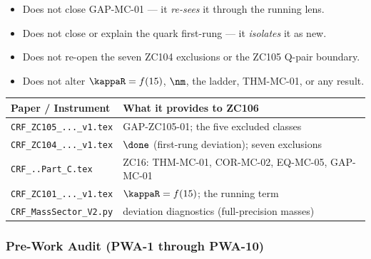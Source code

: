 \documentclass[12pt, a4paper]{article}
\begin{document}
\begin{keybox}[title={What ZC106 Does NOT Do}]
\begin{itemize}[leftmargin=2em, noitemsep]
  \item Does not close GAP-MC-01 --- it \emph{re-sees} it through the running lens.
  \item Does not close or explain the quark first-rung --- it \emph{isolates} it
    as new.
  \item Does not re-open the seven ZC104 exclusions or the ZC105 Q-pair boundary.
  \item Does not alter $\kappaR=f(15)$, $\nm$, the ladder, THM-MC-01, or any
    result.
\end{itemize}
\end{keybox}

\begin{keybox}[title={Companion Papers --- ZC106}]
{\small\renewcommand{\arraystretch}{1.25}
\begin{center}
\begin{tabular}{@{}p{5.0cm}p{7.5cm}@{}}
\toprule
\textbf{Paper / Instrument} & \textbf{What it provides to ZC106} \\
\midrule
\texttt{CRF\_ZC105\_...\_v1.tex}   & GAP-ZC105-01; the five excluded classes \\
\texttt{CRF\_ZC104\_...\_v1.tex}   & $\done$ (first-rung deviation); seven exclusions \\
\texttt{CRF\_..Part\_C.tex}        & ZC16: THM-MC-01, COR-MC-02, EQ-MC-05, GAP-MC-01 \\
\texttt{CRF\_ZC101\_...\_v1.tex}   & $\kappaR=f(15)$; the running term \\
\texttt{CRF\_MassSector\_V2.py}    & deviation diagnostics (full-precision masses) \\
\bottomrule
\end{tabular}
\end{center}}
\end{keybox}

\subsubsection{Pre-Work Audit (PWA-1 through PWA-10)}
\end{document}
